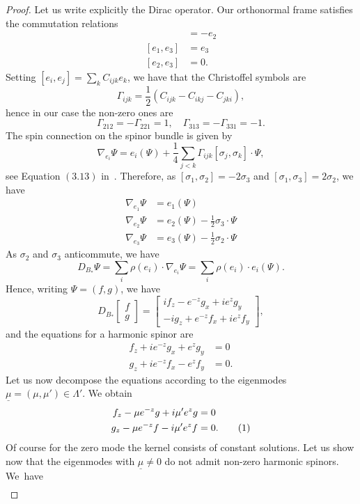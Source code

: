 \documentclass[11pt]{article}
\theoremstyle{definition}
\numberwithin{equation}{section}
\numberwithin{figure}{section}
\numberwithin{table}{section}
\newcommand\numberthis{\addtocounter{equation}{1}\tag{\theequation}}
\begin{document}
\begin{proof}
Let us write explicitly the Dirac operator. Our orthonormal frame satisfies the commutation relations
\begin{align*}
[e_1,e_2]&=-e_2\\
[e_1,e_3]&=e_3\\
[e_2,e_3]&=0.
\end{align*}
Setting $[e_i,e_j]=\sum_k C_{ijk} e_k$, we have that the Christoffel symbols are
\[
\Gamma_{ijk}=\frac{1}{2}(C_{ijk}-C_{ikj}-C_{jki}),
\]
hence in our case the non-zero ones are
\[
\Gamma_{212}=-\Gamma_{221}=1,\quad \Gamma_{313}=-\Gamma_{331}=-1.
\]
The spin connection on the spinor bundle is given by
\[
\nabla_{e_i}\Psi=e_i(\Psi)+\frac{1}{4}\sum_{j<k}\Gamma_{ijk}[\sigma_j,\sigma_k]\cdot \Psi,
\]
see Equation $(3.13)$ in~\cite[Section~3.3]{BGV}. Therefore, as $[\sigma_1,\sigma_2]=-2\sigma_3$ and $[\sigma_1,\sigma_3]=2\sigma_2$, we have
\begin{align*}
\nabla_{e_1}\Psi&=e_1(\Psi)\\
\nabla_{e_2}\Psi&=e_2(\Psi)-\frac{1}{2}\sigma_3\cdot\Psi\\
\nabla_{e_3}\Psi&=e_3(\Psi)-\frac{1}{2}\sigma_2\cdot\Psi
\end{align*}
As $\sigma_2$ and $\sigma_3$ anticommute, we have
\[
D_{B_*}\Psi=\sum_i\rho(e_i)\cdot\nabla_{e_i}\Psi=\sum_i\rho(e_i)\cdot{e_i}(\Psi).
\]
Hence, writing $\Psi=(f, g)$, we have
\[
D_{B_*}
\begin{bmatrix}f\\g
\end{bmatrix}=
\begin{bmatrix}
if_z-e^{-z}g_x+ie^zg_y\\
-ig_z+e^{-z}f_x+ie^zf_y
\end{bmatrix},
\]
and the equations for a harmonic spinor are
\begin{align*}
f_z+ie^{-z}g_x+e^zg_y&=0\\
g_z+ie^{-z}f_x-e^zf_y&=0.
\end{align*}
Let us now decompose the equations according to the eigenmodes $\underline{\mu}=(\mu,\mu')\in\Lambda'$. We obtain
\begin{align*}
f_z-\mu e^{-z}g+i{\mu'}e^zg&=0\\
g_z-\mu e^{-z}f-i{\mu'}e^zf&=0. \numberthis \label{ode}
\end{align*}
Of course for the zero mode the kernel consists of constant solutions. Let us show now that the eigenmodes with $\underline{\mu}\neq 0$ do not admit non-zero harmonic spinors. We~have
\begin{align*}

\end{align*}
\end{proof}
\end{document}
